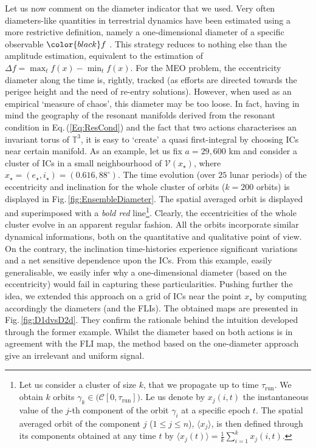 \documentclass{amsart}
\theoremstyle{definition}
\theoremstyle{remark}
\numberwithin{equation}{section}
\newcommand{\eg}{\textit{e.g.,\ }}
\begin{document}
Let us now comment on the diameter indicator that we used. 
{\color{black}Very often}
diameters-like quantities in terrestrial dynamics have been estimated using a more 
restrictive definition, namely a one-dimensional diameter of a specific observable 
${\color{black}f}$ \citep[see, \eg][]{eAl16,aRo17}. 
This strategy reduces to nothing else than the amplitude estimation, {\color{black} equivalent to the estimation of $\Delta f = \max_{t} f(x) - \min_{t}f(x)$}. For the 
MEO problem, the eccentricity diameter along the time is, rightly, tracked ({\color{black}as efforts are directed towards the perigee height and the need of re-entry solutions}).
{\color{black}However, when used as 
an empirical `measure of chaos', this diameter may be too loose.} In fact, having in mind the geography of the resonant 
manifolds derived from the resonant condition in Eq.\,(\ref{Eq:ResCond}) and the fact that two 
actions characterises an invariant torus of $\mathbb{T}^{3}$,  it is easy to `create' a quasi first-integral by choosing ICs near certain manifold. 
As an example, let us fix $a=29,600$ km and consider a cluster of ICs in a small neighbourhood of $\mathcal{V}(x_{\star})$, where $x_{\star}=(e_{\star},i_{\star})=(0.616,88^{\circ})$. 
The time evolution (over $25$ lunar periods) of the eccentricity and inclination for the whole 
cluster of orbits ($k=200$ orbits) is displayed in Fig.\,\ref{fig:EnsembleDiameter}.  The spatial 
averaged orbit is displayed and superimposed with a {\it bold red} line\footnote{
Let us consider a cluster of size $k$, that we propagate up to  time $\tau_{\textrm{run}}$. We obtain  $k$ orbits $\gamma_{k} \in \big(\mathcal{C}[0,\tau_{\textrm{run}}]\big)$.  Le us denote by $x_{j}(i,t)$ the instantaneous value of the $j$-th component of the orbit $\gamma_{i}$ at a specific epoch $t$.  The spatial averaged orbit of the component $j$ ($1 \le j \le n$), $\langle x_{j} \rangle$, is then defined through  its components obtained at
any time $t$ by
$
	\langle x_{j}(t) \rangle = \frac{1}{k}\sum_{i=1}^{k} x_{j}(i,t).
$
}.
Clearly, the eccentricities of the whole cluster evolve in an apparent  regular fashion. All the 
orbits incorporate  similar dynamical informations, both  on the quantitative and qualitative point 
of view. On the contrary, the inclination time-histories experience significant variations and a net 
sensitive dependence upon the ICs. 
From this example, easily generalisable, we easily infer why a one-dimensional diameter (based 
on the eccentricity) would fail in capturing these particularities. Pushing further the idea, we 
extended this approach on a grid of ICs near the point $x_{\star}$ by computing accordingly the 
diameters (and the FLIs).  The obtained maps are presented in Fig.\,\ref{fig:D1dvsD2d}. They 
confirm the rationale behind the intuition developed through the former example. Whilst the 
diameter based on both actions is in agreement with the FLI map, the method based on the one-diameter approach give {\color{black}an} irrelevant and {\color{black}uniform} signal. 
\end{document}
